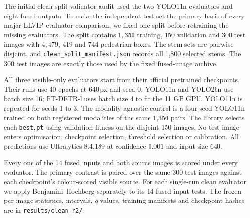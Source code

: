 \documentclass[10pt,a4paper]{article}
\begin{document}
The initial clean-split validator audit used the two YOLO11n evaluators and
eight fused outputs. To make the independent test set the primary basis of every major
LLVIP evaluator comparison, we fixed one split before retraining the missing
evaluators. The split contains $1{,}350$ training, $150$ validation and $300$ test
images with $4{,}479$, $419$ and $744$ pedestrian boxes. The stem sets are pairwise
disjoint, and \texttt{clean\_split\_manifest.json} records all 1,800 selected stems.
The 300 test images are exactly those used by the fixed fused-image archive.

All three visible-only evaluators start from their official pretrained checkpoints.
Their runs use 40 epochs at $640$\,px and seed 0. YOLO11n and YOLO26n use batch size 16;
RT-DETR-l uses batch size 4 to fit the 11 GB GPU. YOLO11n is repeated for seeds 1 to 3.
The modality-agnostic control is a four-seed YOLO11n trained on both registered
modalities of the same 1,350 pairs. The library selects each \texttt{best.pt} using
validation fitness on the disjoint 150 images. No test image enters optimisation,
checkpoint selection, threshold selection or calibration. All predictions use
Ultralytics 8.4.189 at confidence $0.001$ and input size $640$.

Every one of the 14 fused inputs and both source images is scored under every
evaluator. The primary contrast is paired over the same 300 test images against each
checkpoint's colour-scored visible source. For each single-run clean evaluator we apply
Benjamini--Hochberg separately to its 14 fused-input tests. The frozen per-image
statistics, intervals, $q$ values, training manifests and checkpoint hashes are in
\texttt{results/clean\_r2/}.
\end{document}
